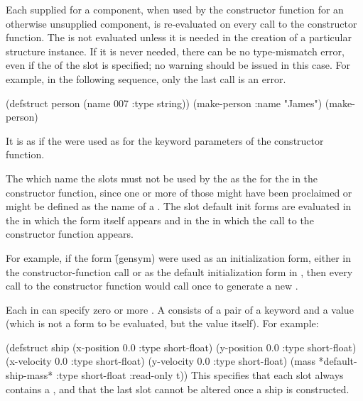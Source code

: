 Each  supplied for a  component,
when used by the constructor function for an otherwise unsupplied
component, is re-evaluated on every call to the
constructor function.  
The  is not evaluated 
        unless it is needed in the creation of a particular structure
        instance.  If it is never needed, there can be no type-mismatch
        error, even if the  
of the slot is specified; no warning
        should be issued in this case.
For example, in the following sequence, only the last call is an error.
 
\code
 (defstruct person (name 007 :type string)) 
 (make-person :name "James")
 (make-person)
\endcode
 
It is as if the  were
used as  for the keyword parameters of the
constructor function.
 
The  which name the slots must not be used by the 
 as the  for the 
in the constructor function, since one or more of those 
might have been proclaimed  or might be defined as
the name of a .
The slot default init forms are evaluated 
in the  in which the  form itself appears and
in the  in which the call to the constructor function appears.

For example, if the form \f{(gensym)} were used as an initialization form,
either in the constructor-function call or as the default initialization form
in , then every call to the constructor function would call
 once to generate a new .

Each  in  can specify zero or more
.  
A  consists of a pair of a keyword and a value
(which is not a form to be evaluated, but the value itself).  For example:

\code
 (defstruct ship
   (x-position 0.0 :type short-float)
   (y-position 0.0 :type short-float)
   (x-velocity 0.0 :type short-float)
   (y-velocity 0.0 :type short-float)
   (mass *default-ship-mass* :type short-float :read-only t))
\endcode
This specifies that each slot always contains a ,
and that the last slot cannot be altered once a ship is constructed.

